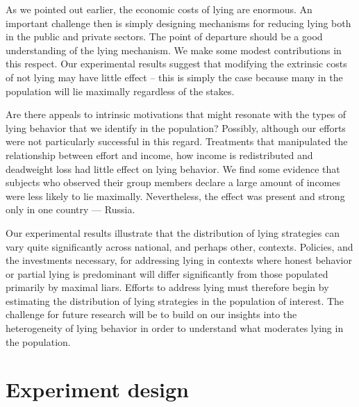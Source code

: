 \documentclass[12pt]{article}
\begin{document}
\par As we pointed out earlier, the economic costs of lying are enormous.  An important challenge then is simply designing mechanisms for reducing lying both in the public and private sectors. The point of departure should be a good understanding of the lying mechanism.  We make some modest contributions in this respect.  Our experimental results suggest that modifying the extrinsic costs of not lying may have little effect -- this is simply the case because many in the population will lie maximally regardless of the stakes.  

\par Are there appeals to intrinsic motivations that might resonate with the types of lying behavior that we identify in the population?  Possibly, although our efforts were not particularly successful in this regard.  Treatments that manipulated the relationship between effort and income, how income is redistributed and deadweight loss had little effect on lying behavior. We find some evidence that subjects who observed their group members declare a large amount of incomes were less likely to lie maximally. Nevertheless, the effect was present and strong only in one country --- Russia.    

\par Our experimental results illustrate that the distribution of lying strategies can vary quite significantly across national, and perhaps other, contexts. Policies, and the investments necessary, for addressing lying in contexts where honest behavior or partial lying is predominant will differ significantly from those populated primarily by maximal liars. Efforts to address lying must therefore begin by estimating the distribution of lying strategies in the population of interest.  The challenge for future research will be to build on our insights into the heterogeneity of lying behavior in order to understand what moderates lying in the population. 


\pagebreak
\doublespacing


\newpage

\setcounter{section}{0}
\renewcommand\thesection{Appendix \Alph{section}}
\renewcommand\thesubsection{\Alph{section}\arabic{subsection}}
\renewcommand\thefigure{\Alph{section}\arabic{figure}}
\renewcommand\thetable{\Alph{section}\arabic{table}}

\section{Experiment design}
\setcounter{table}{0}
\setcounter{figure}{0}
\label{Appendix_Design}
\end{document}
